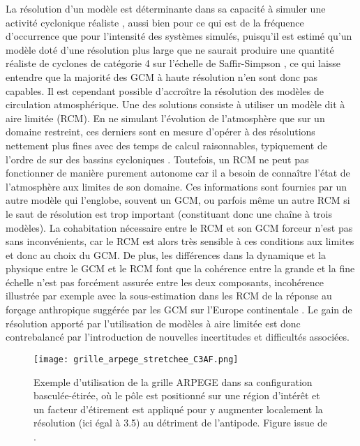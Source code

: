 \documentclass[../main.tex]{subfiles}
\begin{document}
La résolution d'un modèle est déterminante dans sa capacité à simuler une activité cyclonique réaliste \parencite{roberts_impact_2020}, aussi bien pour ce qui
est de la fréquence d'occurrence que pour l'intensité des systèmes simulés, puisqu'il est estimé qu'un modèle doté d'une résolution plus large que  ne
saurait produire une quantité réaliste de cyclones de catégorie 4 sur l'échelle de Saffir-Simpson \parencite{davis_resolving_2018}, ce qui laisse entendre que
la majorité des GCM à haute résolution n'en sont donc pas capables. Il est cependant possible d'accroître la résolution des modèles de circulation
atmosphérique. Une des solutions consiste à utiliser un modèle dit à aire limitée (RCM). En ne simulant l'évolution de l'atmosphère que sur un domaine
restreint, ces derniers sont en mesure d'opérer à des résolutions nettement plus fines avec des temps de calcul raisonnables, typiquement de l'ordre de 
sur des bassins cycloniques \parencite{redmond_projected_2015,gallo_highresolution_2019,torres-alavez_future_2021}. Toutefois, un RCM ne peut pas fonctionner de
manière purement autonome car il a besoin de connaître l'état de l'atmosphère aux limites de son domaine. Ces informations sont fournies par un autre modèle qui
l'englobe, souvent un GCM, ou parfois même un autre RCM si le saut de résolution est trop important (constituant donc une chaîne à trois modèles). La
cohabitation nécessaire entre le RCM et son GCM forceur n'est pas sans inconvénients, car le RCM est alors très sensible à ces conditions aux limites
\parencite{wu_estimating_2005} et donc au choix du GCM. De plus, les différences dans la dynamique et la physique entre le GCM et le RCM font que la cohérence
entre la grande et la fine échelle n'est pas forcément assurée entre les deux composants, incohérence illustrée par exemple avec la sous-estimation dans les RCM
de la réponse au forçage anthropique suggérée par les GCM sur l'Europe continentale \parencite{boe_large_2020,taranu_mechanisms_2023}. Le gain de résolution
apporté par l'utilisation de modèles à aire limitée est donc contrebalancé par l'introduction de nouvelles incertitudes et difficultés associées.

\begin{figure}[tb]
    \centering
    \texttt{[image: grille\_arpege\_stretchee\_C3AF.png]}
    \caption{Exemple d'utilisation de la grille ARPEGE dans sa configuration basculée-étirée, où le pôle est positionné sur une région d'intérêt et un facteur
    d'étirement est appliqué pour y augmenter localement la résolution (ici égal à \num{3.5}) au détriment de l'antipode. Figure issue de
    \textcite{chauvin_future_2020}.}
    \label{fig:rotated_streched}
\end{figure}
\end{document}
